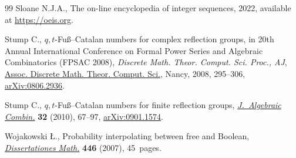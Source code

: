 \documentclass[pdftex]{sigma}
\numberwithin{equation}{section}
\begin{document}
\begin{thebibliography}{99}
Sloane N.J.A., The on-line encyclopedia of integer sequences, 2022, available
 at \url{https://oeis.org}.

Stump C., {$q,t$}-{F}u\ss--{C}atalan numbers for complex reflection groups, in
 20th {A}nnual {I}nternational {C}onference on {F}ormal {P}ower {S}eries and
 {A}lgebraic {C}ombinatorics ({FPSAC} 2008), \textit{Discrete Math. Theor. Comput.
 Sci. Proc., AJ}, \href{https://doi.org/10.46298/dmtcs.3639}{Assoc. Discrete Math. Theor. Comput. Sci.}, Nancy, 2008,
 295--306, \href{https://arxiv.org/abs/0806.2936}{arXiv:0806.2936}.

Stump C., {$q,t$}-{F}u\ss--{C}atalan numbers for finite reflection groups,
 \href{https://doi.org/10.1007/s10801-009-0205-0}{\textit{J.~Algebraic Combin.}} \textbf{32} (2010), 67--97, \href{https://arxiv.org/abs/0901.1574}{arXiv:0901.1574}.

Wojakowski {\L}., Probability interpolating between free and {B}oolean,
 \href{https://doi.org/10.4064/dm446-0-1}{\textit{Dissertationes Math.}} \textbf{446} (2007), 45~pages.

\end{thebibliography}\LastPageEnding
\end{document}
